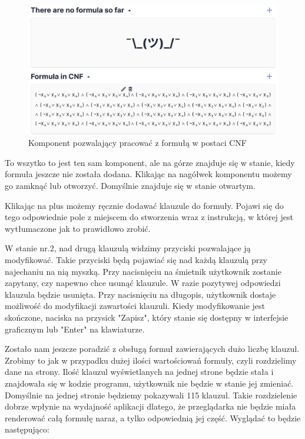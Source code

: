 \documentclass[a4paper,12pt,oneside]{book}
\theoremstyle{definition}
\begin{document}
\begin{figure}[ht]
    \centering
    \includegraphics[width=14.30cm]{9}
    \caption{Komponent pozwalający pracować z formułą w postaci CNF}
    \label{fig:9}
\end{figure}

\noindent To wszytko to jest ten sam komponent, ale na górze znajduje się w stanie, kiedy formuła jeszcze nie została dodana. Klikając na nagółwek komponentu możemy go zamknąć lub otworzyć. Domyślnie znajduje się w stanie otwartym.

Klikając na plus możemy ręcznie dodawać klauzule do formuły. Pojawi się do tego odpowiednie pole z miejscem do stworzenia wraz z instrukcją, w której jest wytłumaczone jak to prawidłowo zrobić.

W stanie nr.2, nad drugą klauzulą widzimy przyciski pozwalające ją modyfikować. Takie przyciski będą pojawiać się nad każdą klauzulą przy najechaniu na nią myszką. Przy nacisnięciu na śmietnik użytkownik zostanie zapytany, czy napewno chce usunąć klauzule. W razie pozytywej odpowiedzi klauzula będzie usunięta. Przy nacisnięciu na długopis, użytkownik dostaje możliwość do modyfikacji zawartości klauzuli. Kiedy modyfikowanie jest skończone, naciska na przysick "Zapisz", który stanie się dostępny w interfejsie graficznym lub "Enter" na klawiaturze.

Zostało nam jeszcze poradzić z obsługą formuł zawierających dużo liczbę klauzul. Zrobimy to jak w przypadku dużej ilości wartościowań formuły, czyli rozdzielimy dane na strony. Ilość klauzul wyświetlanych na jednej strone będzie stała i znajdowała się w kodzie programu, użytkownik nie będzie w stanie jej zmieniać. Domyślnie na jednej stronie będziemy pokazywali 115 klauzul. Takie rozdzielenie dobrze wpłynie na wydajność aplikacji dlatego, że przeglądarka nie będzie miała renderować całą formułę naraz, a tylko odpowiednią jej część. Wyglądać to będzie następująco:
\end{document}
